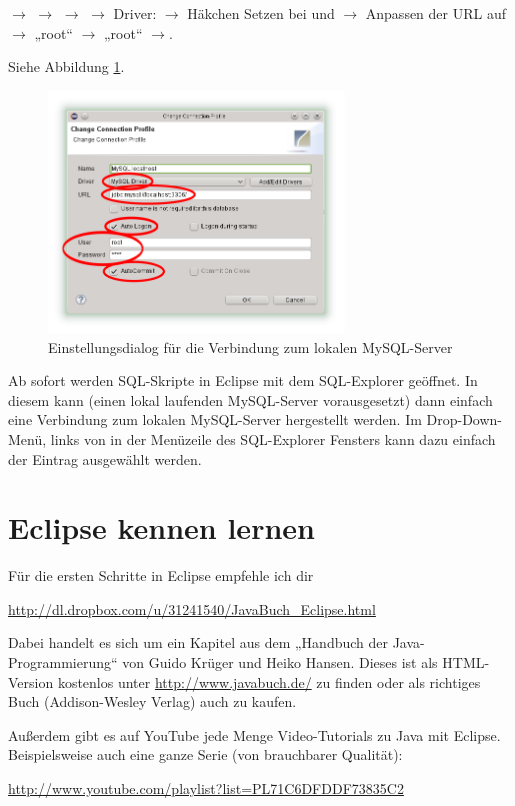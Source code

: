 $\rightarrow$  $\rightarrow$ 
$\rightarrow$  $\rightarrow$ Driver: 
$\rightarrow$ Häkchen Setzen bei  und 
$\rightarrow$ Anpassen der URL auf 
$\rightarrow$  „root“ $\rightarrow$
 „root“ $\rightarrow$. 

Siehe Abbildung \ref{fig:sql-explorer-connection-profile}.

\begin{figure}[h]
  \centering
   \includegraphics[width=0.7\textwidth]{./inf/SEKII/01_Vorbereitung/SQL-Explorer_Connection-Profile.png}
   \caption{Einstellungsdialog für die Verbindung zum lokalen MySQL-Server}
   \label{fig:sql-explorer-connection-profile}
\end{figure}

Ab sofort werden SQL-Skripte in Eclipse mit dem SQL-Explorer geöffnet. In diesem
kann (einen lokal laufenden MySQL-Server vorausgesetzt)  dann einfach eine
Verbindung zum lokalen MySQL-Server hergestellt werden. Im Drop-Down-Menü,
links von  in der Menüzeile des SQL-Explorer Fensters kann
dazu einfach der Eintrag  ausgewählt werden.



\section{Eclipse kennen lernen}

Für die ersten Schritte in Eclipse empfehle ich dir

\url{http://dl.dropbox.com/u/31241540/JavaBuch_Eclipse.html} 

Dabei handelt es sich um ein Kapitel aus dem „Handbuch der Java-Programmierung“
von Guido Krüger und Heiko Hansen. Dieses ist als HTML-Version kostenlos unter
\url{http://www.javabuch.de/} zu finden oder als richtiges Buch (Addison-Wesley
Verlag) auch zu kaufen.

\begin{minipage}{\textwidth}
Außerdem gibt es auf YouTube jede Menge Video-Tutorials zu Java mit Eclipse.
Beispielsweise auch eine ganze Serie (von brauchbarer Qualität):

\url{http://www.youtube.com/playlist?list=PL71C6DFDDF73835C2}
\end{minipage}
